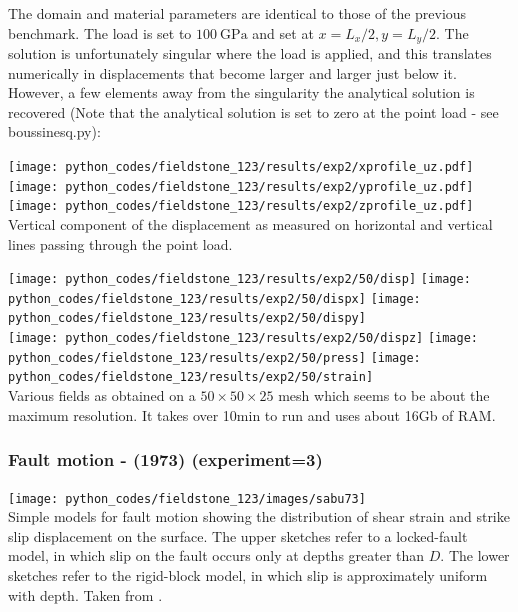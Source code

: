 The domain and material parameters are identical to those of the previous benchmark. The load is 
set to $\SI{100}{\giga\pascal}$ and set at $x=L_x/2,y=L_y/2$.
The solution is unfortunately singular where the load is applied, and this translates numerically in displacements
that become larger and larger just below it. However, a few elements away from the singularity the 
analytical solution is recovered (Note that the analytical solution is set to zero at the point load - 
see {\pythonfile boussinesq.py}):

\begin{center}
\texttt{[image: python\_codes/fieldstone\_123/results/exp2/xprofile\_uz.pdf]}
\texttt{[image: python\_codes/fieldstone\_123/results/exp2/yprofile\_uz.pdf]}
\texttt{[image: python\_codes/fieldstone\_123/results/exp2/zprofile\_uz.pdf]}\\
{\captionfont Vertical component of the displacement as measured on horizontal and 
vertical lines passing through the point load.}
\end{center}



\begin{center}
\texttt{[image: python\_codes/fieldstone\_123/results/exp2/50/disp]} 
\texttt{[image: python\_codes/fieldstone\_123/results/exp2/50/dispx]} 
\texttt{[image: python\_codes/fieldstone\_123/results/exp2/50/dispy]} \\
\texttt{[image: python\_codes/fieldstone\_123/results/exp2/50/dispz]} 
\texttt{[image: python\_codes/fieldstone\_123/results/exp2/50/press]} 
\texttt{[image: python\_codes/fieldstone\_123/results/exp2/50/strain]}\\ 
{\captionfont Various fields as obtained on a $50\times 50 \times25$ mesh
which seems to be about the maximum resolution. It takes over 10min to run and uses about 16Gb of RAM.}
\end{center}

\subsubsection*{Fault motion - \textcite{sabu73} (1973) (experiment=3)}


\begin{center}
\texttt{[image: python\_codes/fieldstone\_123/images/sabu73]}\\
{\captionfont  Simple models for fault motion showing the distribution of shear 
strain and strike slip displacement on the surface. The upper sketches refer to 
a locked-fault model, in which slip on the fault occurs only at depths greater than $D$. 
The lower sketches refer to the rigid-block model, in which slip is approximately uniform with depth.
Taken from \textcite{sabu73}.}
\end{center}

